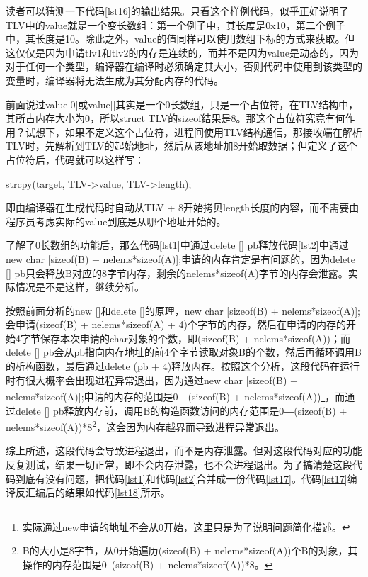 \documentclass[a4paper, 12pt, titlepage]{article}
\begin{document}
读者可以猜测一下代码\ref{lst16}的输出结果。只看这个样例代码，似乎正好说明了TLV中的value就是一个变长数组：第一个例子中，其长度是0x10，第二个例子中，其长度是10。除此之外，value的值同样可以使用数组下标的方式来获取。但这仅仅是因为申请tlv1和tlv2的内存是连续的，而并不是因为value是动态的，因为对于任何一个类型，编译器在编译时必须确定其大小，否则代码中使用到该类型的变量时，编译器将无法生成为其分配内存的代码。

前面说过value[0]或value[]其实是一个0长数组，只是一个占位符，在TLV结构中，其所占内存大小为0，所以struct TLV的sizeof结果是8。那这个占位符究竟有何作用？试想下，如果不定义这个占位符，进程间使用TLV结构通信，那接收端在解析TLV时，先解析到TLV的起始地址，然后从该地址加8开始取数据；但定义了这个占位符后，代码就可以这样写：
\begin{center}
strcpy(target, TLV->value, TLV->length);
\end{center}
即由编译器在生成代码时自动从TLV + 8开始拷贝length长度的内容，而不需要由程序员考虑实际的value到底是从哪个地址开始的。

了解了0长数组的功能后，那么代码\ref{lst1}中通过delete [] pb释放代码\ref{lst2}中通过new char [sizeof(B) + nelems*sizeof(A)];申请的内存肯定是有问题的，因为delete [] pb只会释放B对应的8字节内存，剩余的nelems*sizeof(A)字节的内存会泄露。实际情况是不是这样，继续分析。

按照前面分析的new []和delete []的原理，new char [sizeof(B) + nelems*sizeof(A)];会申请(sizeof(B) + nelems*sizeof(A) + 4)个字节的内存，然后在申请的内存的开始4字节保存本次申请的char对象的个数，即(sizeof(B) + nelems*sizeof(A))；而delete [] pb会从pb指向内存地址的前4个字节读取对象B的个数，然后再循环调用B的析构函数，最后通过delete (pb + 4)释放内存。按照这个分析，这段代码在运行时有很大概率会出现进程异常退出，因为通过new char [sizeof(B) + nelems*sizeof(A)];申请的内存的范围是0―(sizeof(B) + nelems*sizeof(A))\footnote{实际通过new申请的地址不会从0开始，这里只是为了说明问题简化描述。}，而通过delete [] pb释放内存前，调用B的构造函数访问的内存范围是0―(sizeof(B) + nelems*sizeof(A))*8\footnote{B的大小是8字节，从0开始遍历(sizeof(B) + nelems*sizeof(A))个B的对象，其操作的内存范围是0~(sizeof(B) + nelems*sizeof(A))*8。}，这会因为内存越界而导致进程异常退出。

综上所述，这段代码会导致进程退出，而不是内存泄露。但对这段代码对应的功能反复测试，结果一切正常，即不会内存泄露，也不会进程退出。为了搞清楚这段代码到底有没有问题，把代码\ref{lst1}和代码\ref{lst2}合并成一份代码\ref{lst17}。代码\ref{lst17}编译反汇编后的结果如代码\ref{lst18}所示。
\begin{spacing}{1.0}
  
\end{spacing}
\begin{spacing}{1.0}
Assembler}]{list/test2.s}
\end{spacing}
\end{document}
